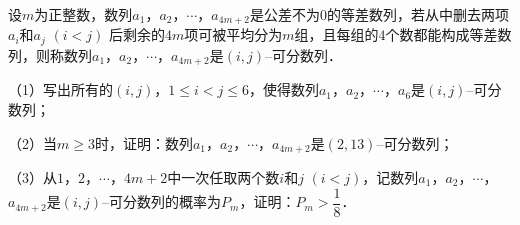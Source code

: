 \documentclass[a4paper, 11pt]{article}
\begin{document}
\begin{problem}[points=17]
	设$m$为正整数，数列$a_1$，$a_2$，$\cdots$，$a_{4m+2}$是公差不为$0$的等差数列，若从中删去两项$a_i$和$a_j$ $(i<j)$ 后剩余的$4m$项可被平均分为$m$组，且每组的$4$个数都能构成等差数列，则称数列$a_1$，$a_2$，$\cdots$，$a_{4m+2}$是$(i, j)$--可分数列．
	
	（1）写出所有的$(i,j)$，$1\leqslant i<j\leqslant 6$，使得数列$a_1$，$a_2$，$\cdots$，$a_{6}$是$(i,j)$--可分数列；
	
	（2）当$m\geqslant 3$时，证明：数列$a_1$，$a_2$，$\cdots$，$a_{4m+2}$是$(2,13)$--可分数列；
	
	（3）从$1$，$2$，$\cdots$，$4m+2$中一次任取两个数$i$和$j$ $(i<j)$，记数列$a_1$，$a_2$，$\cdots$，$a_{4m+2}$是$(i,j)$--可分数列的概率为$P_m$，证明：$P_m>\dfrac{1}{8}$．
\end{problem}
\end{document}
